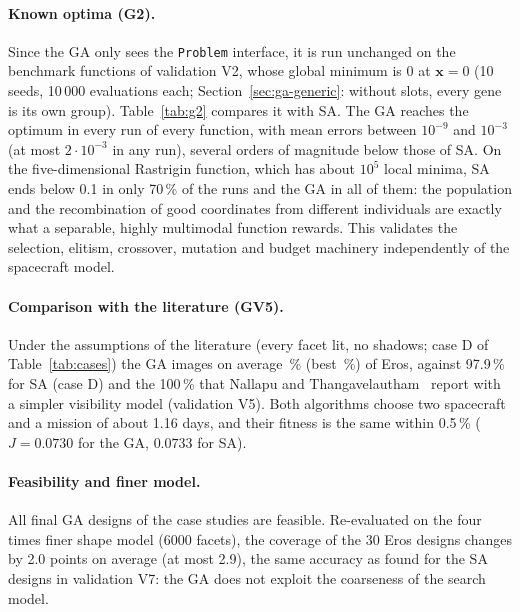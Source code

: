 \paragraph{Known optima (G2).} Since the \ac{GA} only sees the \texttt{Problem} interface, it is run
unchanged on the benchmark functions of validation V2, whose global minimum is 0 at $\mathbf{x}=0$
(10 seeds, 10\,000 evaluations each; Section~\ref{sec:ga-generic}: without slots, every gene is its
own group). Table~\ref{tab:g2} compares it with \ac{SA}. The \ac{GA} reaches the optimum in every
run of every function, with mean errors between $10^{-9}$ and $10^{-3}$ (at most $2\cdot10^{-3}$ in any run), several orders of magnitude
below those of \ac{SA}. On the five-dimensional Rastrigin function, which has about $10^5$ local
minima, \ac{SA} ends below 0.1 in only 70\,\% of the runs and the \ac{GA} in all of them: the
population and the recombination of good coordinates from different individuals are exactly what
a separable, highly multimodal function rewards. This validates the selection, elitism, crossover,
mutation and budget machinery independently of the spacecraft model.

\begin{table}[htbp]
\centering
\caption{Known-optimum test (minimum 0): best value reached, 10 seeds $\times$ 10\,000 evaluations.}
\label{tab:g2}
\small

\end{table}

\paragraph{Comparison with the literature (GV5).} Under the assumptions of the literature (every
facet lit, no shadows; case D of Table~\ref{tab:cases}) the \ac{GA} images on average
\gaAllLitC\,\% (best \gaAllLitBestC\,\%) of Eros, against 97.9\,\% for \ac{SA} (case D) and the
100\,\% that Nallapu and Thangavelautham~\cite{nallapu2019} report with a simpler visibility model
(validation V5). Both algorithms choose two spacecraft and a
mission of about 1.16 days, and their fitness is the same within 0.5\,\% ($J=0.0730$ for the \ac{GA},
$0.0733$ for \ac{SA}).

\paragraph{Feasibility and finer model.} All \gaFeasible{} final \ac{GA} designs of the case studies
are feasible. Re-evaluated on the four times finer shape model (6000 facets), the coverage of the
30 Eros designs changes by 2.0 points on average (at most 2.9), the same accuracy as found for the
\ac{SA} designs in validation V7: the \ac{GA} does not exploit the coarseness of the search model.

